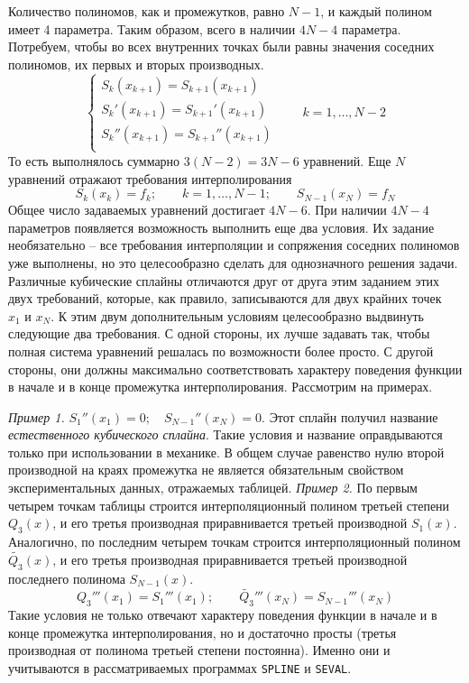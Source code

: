 Количество полиномов, как и промежутков, равно $N - 1$, и каждый полином имеет 4 параметра.
Таким образом, всего в наличии $4N - 4$ параметра. Потребуем, чтобы во всех внутренних точках
были равны значения соседних полиномов, их первых и вторых производных.
\begin{equation*}
    \begin{cases}
        \displaystyle S_k(x_{k+1}) = S_{k+1}(x_{k+1})\\
        S_k'(x_{k+1}) = S_{k+1}'(x_{k+1})\\
        S_k''(x_{k+1}) = S_{k+1}''(x_{k+1})\\
    \end{cases}
    \qquad k = 1,\dots,N-2
\end{equation*}
То есть выполнялось суммарно $3(N-2) = 3N - 6$ уравнений. Еще $N$ уравнений отражают требования
интерполирования
\begin{equation*}
    \displaystyle S_k(x_k) = f_k; \qquad k = 1, \dots, N-1; \qquad S_{N-1}(x_N) = f_N
\end{equation*}
Общее число задаваемых уравнений достигает $4N - 6$. При наличии $4N - 4$ параметров
появляется возможность выполнить еще два условия. Их задание необязательно -- все требования
интерполяции и сопряжения соседних полиномов уже выполнены, но это целесообразно сделать для
однозначного решения задачи. Различные кубические сплайны отличаются друг от друга этим заданием
этих двух требований, которые, как правило, записываются для двух крайних точек $x_1 \text{ и } x_N$.
К этим двум дополнительным условиям целесообразно выдвинуть следующие два требования. С одной стороны,
их лучше задавать так, чтобы полная система уравнений решалась по возможности более просто. С другой
стороны, они должны максимально соответствовать характеру поведения функции в начале и в конце
промежутка интерполирования. Рассмотрим на примерах.
\vspace{10pt}

\emph{Пример 1.} $\displaystyle S_1''(x_1) = 0; \quad S_{N-1}''(x_N) = 0$. Этот сплайн получил название
\emph{естественного кубического сплайна}. Такие условия и название оправдываются только при использовании в механике.
В общем случае равенство нулю второй производной на краях промежутка не является обязательным свойством
экспериментальных данных, отражаемых таблицей.
\emph{Пример 2.} По первым четырем точкам таблицы строится интерполяционный полином третьей степени
$Q_3(x)$, и его третья производная приравнивается третьей производной $S_1(x)$. Аналогично, по
последним четырем точкам строится интерполяционный полином $\tilde{Q_3}(x)$, и его третья
производная приравнивается третьей производной последнего полинома $S_{N-1}(x)$.
\begin{equation*}
    \displaystyle Q_3'''(x_1) = S_1'''(x_1); \qquad \tilde{Q_3}'''(x_N) = S_{N-1}'''(x_N)
\end{equation*}
Такие условия не только отвечают характеру поведения функции в начале и в конце промежутка интерполирования,
но и достаточно просты (третья производная от полинома третьей степени постоянна). Именно они и
учитываются в рассматриваемых программах \verb|SPLINE| и \verb|SEVAL|.


